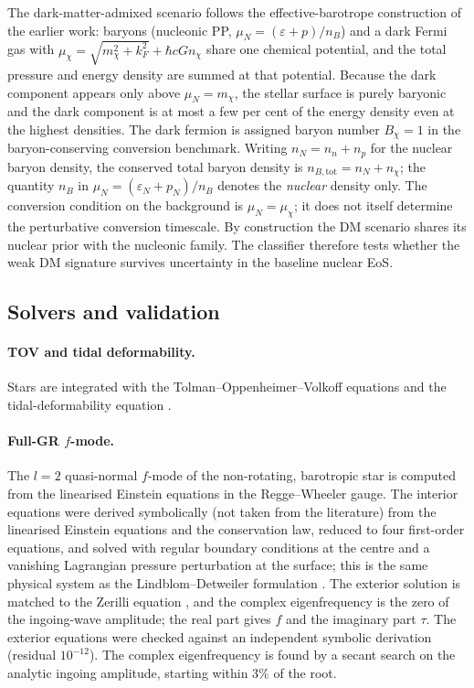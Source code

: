 \documentclass[11pt,a4paper]{article}
\begin{document}
The dark-matter-admixed scenario follows the effective-barotrope construction of the earlier work: baryons (nucleonic PP, $\mu_N=(\varepsilon+p)/n_B$) and a dark Fermi gas with $\mu_\chi=\sqrt{m_\chi^2+k_F^2}+\hbar cGn_\chi$ share one chemical potential, and the total pressure and energy density are summed at that potential. Because the dark component appears only above $\mu_N=m_\chi$, the stellar surface is purely baryonic and the dark component is at most a few per cent of the energy density even at the highest densities. The dark fermion is assigned baryon number $B_\chi=1$ in the baryon-conserving conversion benchmark. Writing $n_N=n_n+n_p$ for the nuclear baryon density, the conserved total baryon density is $n_{B,\mathrm{tot}}=n_N+n_\chi$; the quantity $n_B$ in $\mu_N=(\varepsilon_N+p_N)/n_B$ denotes the \emph{nuclear} density only. The conversion condition on the background is $\mu_N=\mu_\chi$; it does not itself determine the perturbative conversion timescale. By construction the DM scenario shares its nuclear prior with the nucleonic family. The classifier therefore tests whether the weak DM signature survives uncertainty in the baseline nuclear EoS.

\subsection{Solvers and validation}\label{sec:solver}
\paragraph{TOV and tidal deformability.} Stars are integrated with the Tolman--Oppenheimer--Volkoff equations \citep{Tolman39,OV39} and the tidal-deformability equation \citep{Hinderer08}.
\paragraph{Full-GR $f$-mode.} The $l=2$ quasi-normal $f$-mode of the non-rotating, barotropic star is computed from the linearised Einstein equations in the Regge--Wheeler gauge. The interior equations were derived symbolically (not taken from the literature) from the linearised Einstein equations and the conservation law, reduced to four first-order equations, and solved with regular boundary conditions at the centre and a vanishing Lagrangian pressure perturbation at the surface; this is the same physical system as the Lindblom--Detweiler formulation \citep{DL85}. The exterior solution is matched to the Zerilli equation \citep{Zerilli70}, and the complex eigenfrequency is the zero of the ingoing-wave amplitude; the real part gives $f$ and the imaginary part $\tau$. The exterior equations were checked against an independent symbolic derivation (residual $10^{-12}$). The complex eigenfrequency is found by a secant search on the analytic ingoing amplitude, starting within 3\% of the root.
\end{document}
